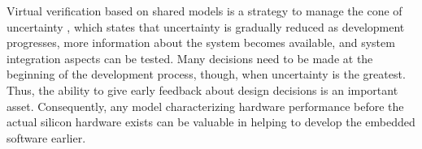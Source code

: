 Virtual verification based on shared models is a strategy to manage the cone of uncertainty \cite{Boehm1981}, 
which states that uncertainty is gradually reduced as development progresses,
more information about the system becomes available,
and system integration aspects can be tested.
Many decisions need to be made at the beginning of the development process, though, when uncertainty is the greatest.
Thus, the ability to give early feedback about design decisions is an important asset.
Consequently, any model characterizing hardware performance before the actual silicon hardware exists can be valuable in helping to develop the embedded software earlier.


